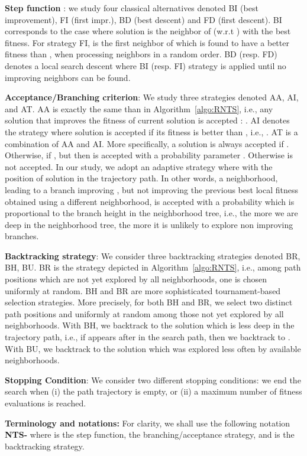 \documentclass{acm_proc_article-sp}
\begin{document}
\textbf{Step function}   : we study four classical alternatives denoted BI (best improvement), FI (first impr.), BD (best descent) and FD (first descent). BI corresponds to the case where solution  is the neighbor of  (w.r.t ) with the best fitness. For strategy FI,  is the first neighbor of  which is found to have a better fitness than , when processing  neighbors in a random order. BD (resp. FD) denotes a local search descent where BI (resp. FI) strategy is applied until no improving neighbors can be found.

\textbf{Acceptance/Branching criterion}: We study three strategies denoted AA, AI, and AT. AA is exactly the same than in Algorithm~\ref{algo:RNTS}, i.e., any solution  that improves the fitness of current solution  is accepted : . AI denotes the strategy where solution  is accepted if its fitness  is better than , i.e., . AT is a combination of AA and AI. More specifically, a solution  is always accepted if . Otherwise, if , but  then  is accepted with a probability parameter . Otherwise  is not accepted. In our study, we adopt an adaptive strategy where  with  the position of solution  in the trajectory path. In other words, a neighborhood, leading to a branch improving  , but not improving the previous best local fitness obtained using a different neighborhood, is accepted with a probability which is proportional to the branch height in the neighborhood tree, i.e., the more we are deep in the neighborhood tree, the more it is unlikely to explore non improving branches.

\textbf{Backtracking strategy}: We consider three backtracking strategies denoted BR, BH, BU. BR is the strategy depicted in Algorithm~\ref{algo:RNTS}, i.e., among path positions which are not yet explored by all neighborhoods, one is chosen uniformly at random. BH and BR are more sophisticated tournament-based selection strategies. More precisely, for both BH and BR, we select two distinct path positions  and  uniformly at random among those not yet explored by all neighborhoods. With BH, we backtrack to the solution which is less deep in the trajectory path, i.e., if  appears after  in the search path, then we backtrack to . With BU, we backtrack to the solution which was explored less often by available neighborhoods.

\textbf{Stopping Condition}: We consider two different stopping conditions: we end the search when (i) the path trajectory is empty, or (ii) a maximum number of fitness evaluations is reached. 

\textbf{Terminology and notations:} For clarity, we shall use the following notation \textbf{NTS-} where  is the step function,  the branching/acceptance strategy, and  is the backtracking strategy.
\end{document}
